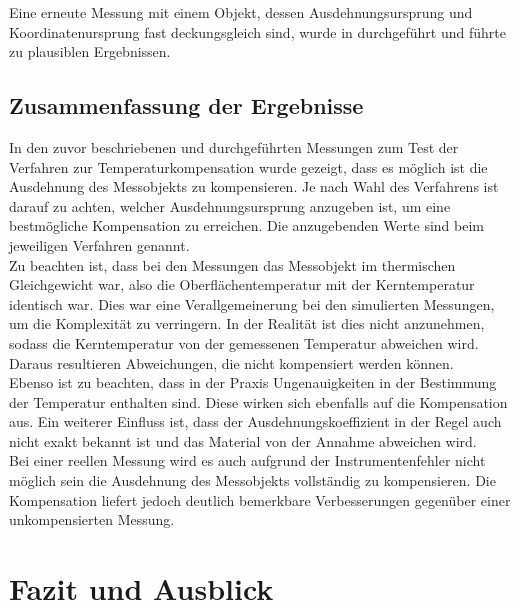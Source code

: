 Eine erneute Messung mit einem Objekt, dessen Ausdehnungsursprung und Koordinatenursprung fast deckungsgleich sind, wurde in \cite{Lux2014} durchgeführt und führte zu plausiblen Ergebnissen.

\section{Zusammenfassung der Ergebnisse}

In den zuvor beschriebenen und durchgeführten Messungen zum Test der Verfahren zur Temperaturkompensation wurde gezeigt, dass es möglich ist die Ausdehnung des Messobjekts zu kompensieren. Je nach Wahl des Verfahrens ist darauf zu achten, welcher Ausdehnungsursprung anzugeben ist, um eine bestmögliche Kompensation zu erreichen. Die anzugebenden Werte sind beim jeweiligen Verfahren genannt. \\
Zu beachten ist, dass bei den Messungen das Messobjekt im thermischen Gleichgewicht war, also die Oberflächentemperatur mit der Kerntemperatur identisch war. Dies war eine Verallgemeinerung bei den simulierten Messungen, um die Komplexität zu verringern. In der Realität ist dies nicht anzunehmen, sodass die Kerntemperatur von der gemessenen Temperatur abweichen wird. Daraus resultieren Abweichungen, die nicht kompensiert werden können.\\
Ebenso ist zu beachten, dass in der Praxis Ungenauigkeiten in der Bestimmung der Temperatur enthalten sind. Diese wirken sich ebenfalls auf die Kompensation aus. Ein weiterer Einfluss ist, dass der Ausdehnungskoeffizient in der Regel auch nicht exakt bekannt ist und das Material von der Annahme abweichen wird.\\
Bei einer reellen Messung wird es auch aufgrund der Instrumentenfehler nicht möglich sein die Ausdehnung des Messobjekts vollständig zu kompensieren. Die Kompensation liefert jedoch deutlich bemerkbare Verbesserungen gegenüber einer unkompensierten Messung.

\chapter{Fazit und Ausblick}

